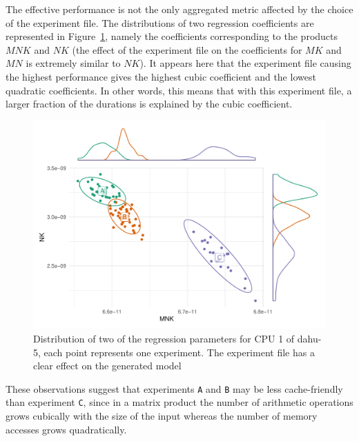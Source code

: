             The effective performance is not the only aggregated metric affected by the choice of the experiment file.
            The distributions of two regression coefficients are represented in
            Figure~\ref{fig:randomizing_sizes:expfile:average_distribution}, namely the coefficients corresponding to
            the products \(MNK\) and \(NK\) (the effect of the experiment file on the coefficients for \(MK\) and \(MN\)
            is extremely similar to \(NK\)). It appears here that the experiment file causing the highest performance
            gives the highest cubic coefficient and the lowest quadratic coefficients. In other words, this means that
            with this experiment file, a larger fraction of the \dgemm durations is explained by the cubic coefficient.

            \begin{figure}[htpb]
                \centering
                \includegraphics[width=\linewidth]{img/experiment/randomizing_sizes/expfile/average_distribution.pdf}
                \caption{Distribution of two of the regression parameters for CPU 1 of dahu-5, each point represents one
                experiment. The experiment file has a clear effect on the generated model}%
                \label{fig:randomizing_sizes:expfile:average_distribution}
            \end{figure}

            These observations suggest that experiments \texttt{A} and \texttt{B} may be less cache-friendly than
            experiment \texttt{C}, since in a matrix product the number of arithmetic operations grows cubically with
            the size of the input whereas the number of memory accesses grows quadratically.

